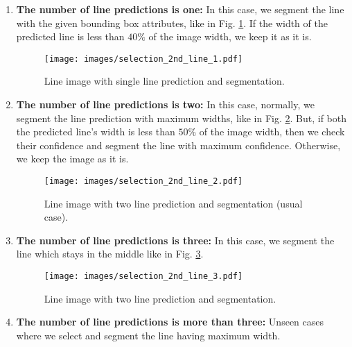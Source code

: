 \documentclass[runningheads]{llncs}
\begin{document}
\begin{enumerate}
  \item \textbf{The number of line predictions is one:} In this case, we segment the line with the given bounding box attributes, like in Fig. \ref{drishti-fig9}. If the width of the predicted line is less than $40\%$ of the image width, we keep it as it is.
  
    \begin{figure}[h]
\centering    
        \texttt{[image: images/selection\_2nd\_line\_1.pdf]}
        \vspace{-4mm}
        \caption{Line image with single line prediction and segmentation.} 
        \label{drishti-fig9}
        \vspace{-4mm}
    \end{figure}
    
  \item \textbf{The number of line predictions is two:} In this case, normally, we segment the line prediction with maximum widths, like in Fig. \ref{drishti-fig10}. But, if both the predicted line's width is less than $50\%$ of the image width, then we check their confidence and segment the line with maximum confidence. Otherwise, we keep the image as it is.
  
  \begin{figure}[h]
  \vspace{-4mm}
    \centering    \texttt{[image: images/selection\_2nd\_line\_2.pdf]}
    \vspace{-4mm}
    \caption{Line image with two line prediction and segmentation (usual case).} 
    \label{drishti-fig10}
    \vspace{-4mm}
  \end{figure}
  
  \item \textbf{The number of line predictions is three:} In this case, we segment the line which stays in the middle like in Fig. \ref{drishti-fig11}.

  \begin{figure}[h]
  \vspace{-4mm}
    \centering    
    \texttt{[image: images/selection\_2nd\_line\_3.pdf]}
    \vspace{-4mm}
    \caption{Line image with two line prediction and segmentation.} 
    \label{drishti-fig11}
    \vspace{-4mm}
  \end{figure}

  \item \textbf{The number of line predictions is more than three:} Unseen cases where we select and segment the line having maximum width.
\end{enumerate}
\end{document}
